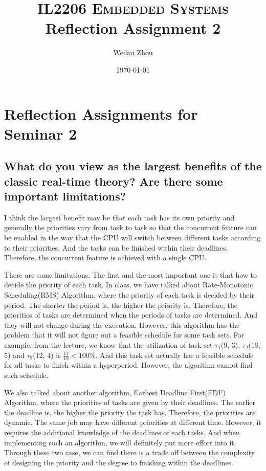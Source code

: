 \documentclass[10pt]{article}
\title{{\normalsize\textsc {IL2206 Embedded Systems}} \\ Reflection Assignment 2}
\author{Weikai Zhou}
\date{\today}
\begin{document}
\maketitle

\section{Reflection Assignments for Seminar 2}

\subsection{What do you view as the largest benefits of the classic real-time theory? Are there some important limitations?}

I think the largest benefit may be that each task has its own priority and generally the priorities vary from task to task so that the concurrent feature can be enabled in the way that the CPU will switch between different tasks according to their priorities, And the tasks can be finished within their deadlines. Therefore, the concurrent feature is achieved with a single CPU.

There are some limitations. The first and the most important one is that how to decide the priority of each task. In class, we have talked about Rate-Monotonic Scheduling(RMS) Algorithm, where the priority of each task is decided by their period. The shorter the period is, the higher the priority is. Therefore, the priorities of tasks are determined when the periods of tasks are determined. And they will not change during the execution. However, this algorithm has the problem that it will not figure out a feasible schedule for some task sets. For example, from the lecture, we know that the utilization of task set $\tau_1$(9, 3), $\tau_2$(18, 5) and $\tau_3$(12, 4) is $\frac{17}{18}<100\%$. And this task set actually has a feasible schedule for all tasks to finish within a hyperperiod. However, the algorithm cannot find such schedule. 

We also talked about another algorithm, Earliest Deadline First(EDF) Algorithm, where the priorities of tasks are given by their deadlines. The earlier the deadline is, the higher the priority the task has. Therefore, the priorities are dynamic. The same job may have different priorities at different time. However, it requires the additional knowledge of the deadlines of each tasks. And when implementing such an algorithm, we will definitely put more effort into it. Through these two case, we can find there is a trade off between the complexity of designing the priority and the degree to finishing within the deadlines. 
\end{document}
